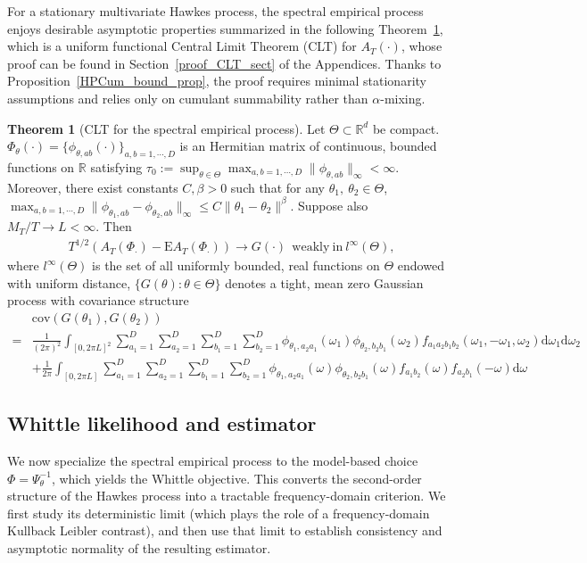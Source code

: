 \documentclass[11pt]{article}
\numberwithin{equation}{section}
\theoremstyle{plain}
\theoremstyle{definition}
\theoremstyle{definition}
\theoremstyle{assumption}
\theoremstyle{proposition}
\theoremstyle{proposition}
\theoremstyle{example}
\theoremstyle{lemma}
\theoremstyle{theorem}
\newtheorem{theorem}{Theorem}[section]
\theoremstyle{remark}
\begin{document}
For a stationary multivariate Hawkes process, the spectral empirical process enjoys desirable asymptotic properties summarized in the following Theorem~\ref{Thm_CLT}, which is a uniform functional Central Limit Theorem (CLT) for $A_T(\cdot)$, whose proof can be found in Section~\ref{proof_CLT_sect} of the Appendices. Thanks to Proposition~\ref{HPCum_bound_prop}, the proof requires minimal stationarity assumptions and relies only on cumulant summability rather than $\alpha$-mixing.
\begin{theorem}[CLT for the spectral empirical process]\label{Thm_CLT}
Let $\Theta\subset\mathbb{R}^d$ be compact. $\Phi_{\theta}(\cdot) = \{\phi_{\theta,ab}(\cdot)\}_{a,b=1,\cdots,D}$ is an Hermitian matrix of continuous, bounded functions on $\mathbb{R}$ satisfying $\tau_0:=\sup_{\theta\in\Theta}\max_{a,b=1,\cdots,D}\|\phi_{\theta,ab}\|_{\infty}< \infty$. Moreover, there exist constants $C,\beta>0$ such that for any $\theta_1,~\theta_2\in\Theta$, $\max_{a,b=1,\cdots,D}\|\phi_{\theta_1, ab} - \phi_{\theta_2, ab}\|_{\infty} \leqslant C\|\theta_1 - \theta_2\|^{\beta}$. Suppose also $M_T/T \rightarrow L < \infty$. Then
\begin{align*}
T^{1/2}(A_T(\Phi_{\cdot}) - \mathrm{E}A_T(\Phi_{\cdot})) \rightarrow G(\cdot) \mathrm{~~weakly~in~} l^{\infty}(\Theta),
\end{align*}
where $l^{\infty}(\Theta)$ is the set of all
uniformly bounded, real functions on $\Theta$ endowed with uniform distance, $\{G(\theta):\theta\in\Theta\}$ denotes a tight, mean zero Gaussian process with covariance structure
\begin{align*}
&\mathrm{cov}(G(\theta_1) , G(\theta_2)) \\
=&\frac{1}{(2\pi)^2}\int_{[0,2\pi L]^2} \sum_{a_1=1}^{D} \sum_{a_2=1}^{D}\sum_{b_1=1}^{D} \sum_{b_2=1}^{D}\phi_{\theta_1, a_2 a_1}(\omega_{1}) \phi_{\theta_2, b_2 b_1}(\omega_{2})f_{a_1 a_2 b_1 b_2}(\omega_{1},-\omega_{1},\omega_{2})\mathrm{d}\omega_1\mathrm{d}\omega_2 \\
&+ \frac{1}{2\pi}\int_{[0,2\pi L]} \sum_{a_1=1}^{D} \sum_{a_2=1}^{D}\sum_{b_1=1}^{D} \sum_{b_2=1}^{D} \phi_{\theta_1, a_2 a_1}(\omega) \phi_{\theta_2, b_2 b_1}(\omega) f_{a_1 b_2}(\omega)f_{a_2 b_1}(-\omega)\mathrm{d}\omega 
\end{align*}
\end{theorem}


\subsection{Whittle likelihood and estimator}\label{Whttiel_sect}
We now specialize the spectral empirical process to the model-based choice $\Phi=\Psi_\theta^{-1}$, which yields the Whittle objective. This converts the second-order structure of the Hawkes process into a tractable frequency-domain criterion. We first study its deterministic limit (which plays the role of a frequency-domain Kullback Leibler contrast), and then use that limit to establish consistency and asymptotic normality of the resulting estimator.
\end{document}
